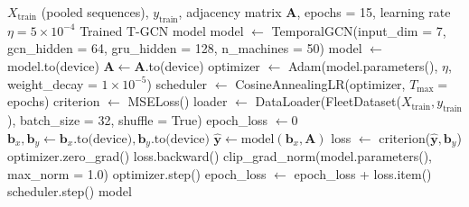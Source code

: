 \begin{appendices}
\begin{algorithm}[H]
\small
\caption{Training Procedure for Temporal Graph Convolutional Network (T-GCN)}
\label{alg:train_tgcn}
\begin{algorithmic}[1]
\Require $X_{\text{train}}$ (pooled sequences), $y_{\text{train}}$, adjacency matrix $\mathbf{A}$, epochs = 15, learning rate $\eta = 5 \times 10^{-4}$
\Ensure Trained T-GCN model
\State model $\gets$ TemporalGCN(input\_dim = 7, gcn\_hidden = 64, gru\_hidden = 128, n\_machines = 50)
\State model $\gets$ model.to(device)
\State $\mathbf{A} \gets \mathbf{A}$.to(device)
\State optimizer $\gets$ Adam(model.parameters(), $\eta$, weight\_decay = $1 \times 10^{-5}$)
\State scheduler $\gets$ CosineAnnealingLR(optimizer, $T_{\max} =$ epochs)
\State criterion $\gets$ MSELoss()
\State loader $\gets$ DataLoader(FleetDataset($X_{\text{train}}, y_{\text{train}}$),
\Statex \hspace{2em} batch\_size = 32, shuffle = True)
    \State epoch\_loss $\gets 0$
        \State $\mathbf{b}_x, \mathbf{b}_y \gets \mathbf{b}_x.\text{to(device)}, \mathbf{b}_y.\text{to(device)}$
        \State $\hat{\mathbf{y}} \gets \text{model}(\mathbf{b}_x, \mathbf{A})$ 
        \State loss $\gets$ criterion($\hat{\mathbf{y}}, \mathbf{b}_y$)
        \State optimizer.zero\_grad()
        \State loss.backward()
        \State clip\_grad\_norm(model.parameters(), max\_norm = 1.0)
        \State optimizer.step()
        \State epoch\_loss $\gets$ epoch\_loss + loss.item()
    \EndFor
    \State scheduler.step()
\EndFor
\State \Return model
\end{algorithmic}
\end{algorithm}


\end{appendices}
